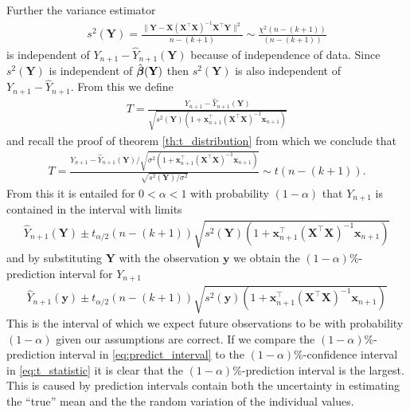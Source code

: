 Further the variance estimator
\begin{align*}
    s^2(\textbf{Y})=\frac{\|\textbf{Y} - \textbf{X}( \textbf{X}^\top\textbf{X} )^{-1}\textbf{X}^\top\textbf{Y}\|^2}{n-(k+1)} \sim \frac{\chi^2(n-(k+1))}{(n-(k+1))}
\end{align*}
is independent of $Y_{n+1}-\hat{Y}_{n+1}(\textbf{Y})$ because of independence of data. Since $s^2(\textbf{Y})$ is independent of $\hat{\operatorname{\boldsymbol{\beta}}}(\textbf{Y})$ then $s^2(\textbf{Y})$ is also independent of $Y_{n+1}-\hat{Y}_{n+1}$. From this we define
\begin{align*}
    T=\frac{Y_{n+1}-\hat{Y}_{n+1}(\textbf{Y})}{\sqrt{s^2(\textbf{Y})(1+\textbf{x}^\top_{n+1}(\textbf{X}^\top\textbf{X})^{-1}\textbf{x}_{n+1})}}
\end{align*}
and recall the proof of theorem \ref{th:t_distribution} from which we conclude that
\begin{align*}
    T=\frac{Y_{n+1}-\hat{Y}_{n+1}(\textbf{Y})/\sqrt{\sigma^2(1+\textbf{x}^\top_{n+1}(\textbf{X}^\top\textbf{X})^{-1}\textbf{x}_{n+1})}}{\sqrt{s^2(\textbf{Y})/\sigma^2}} \sim t(n-(k+1)).
\end{align*}
From this it is entailed for $0<\alpha<1$ with probability $(1-\alpha)$ that $Y_{n+1}$ is contained in the interval with limits
\begin{align*}
    \hat{Y}_{n+1}(\textbf{Y})\pm t_{\alpha/2}(n-(k+1))\sqrt{s^2(\textbf{Y})(1+\textbf{x}^\top_{n+1}(\textbf{X}^\top\textbf{X})^{-1}\textbf{x}_{n+1})}
\end{align*}
and by substituting $\textbf{Y}$ with the observation $\textbf{y}$ we obtain the $(1-\alpha)\%$-prediction interval for $Y_{n+1}$
\begin{align} \label{eq:predict_interval}
    \hat{Y}_{n+1}(\textbf{y})\pm t_{\alpha/2}(n-(k+1))\sqrt{s^2(\textbf{y})(1+\textbf{x}^\top_{n+1}(\textbf{X}^\top\textbf{X})^{-1}\textbf{x}_{n+1})}
\end{align}
This is the interval of which we expect future observations to be with probability $(1-\alpha)$ given our assumptions are correct.
If we compare the $(1-\alpha)\%$-prediction interval in \eqref{eq:predict_interval} to the $(1-\alpha)\%$-confidence interval in \eqref{eq:t_statistic} it is clear that the $(1-\alpha)\%$-prediction interval is the largest.
This is caused by prediction intervals contain both the uncertainty in estimating the ``true'' mean and the the random variation of the individual values.


